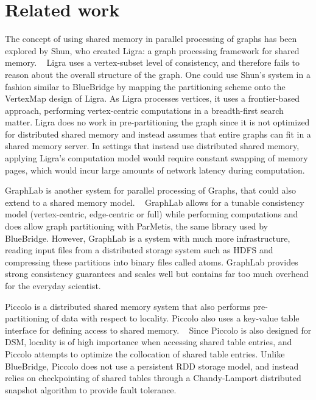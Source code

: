 \section{Related work}
\label{sec:related}


The concept of using shared memory in parallel processing of graphs has been
explored by Shun, who created Ligra: a graph processing framework for shared
memory. ~\cite{Shun:2013:ligra} Ligra uses a vertex-subset level of consistency,
and therefore fails to reason about the overall structure of the graph. One
could use Shun's system in a fashion similar to BlueBridge by mapping the
partitioning scheme onto the VertexMap design of Ligra. As Ligra processes
vertices, it uses a frontier-based approach, performing vertex-centric
computations in a breadth-first search matter. Ligra does no work in
pre-partitioning the graph since it is not optimized for distributed shared
memory and instead assumes that entire graphs can fit in a shared memory
server. In settings that instead use distributed shared memory, applying
Ligra's computation model would require constant swapping of memory pages,
which would incur large amounts of network latency during computation.

GraphLab  is another system for parallel processing of Graphs, that could also
extend to a shared memory model. ~\cite{Low:2012:DGF:2212351.2212354} GraphLab
allows for a tunable consistency model (vertex-centric, edge-centric or full)
while performing computations and does allow graph partitioning with ParMetis,
the same library used by BlueBridge. However, GraphLab is a system with much
more infrastructure, reading input files from a distributed storage system
such as HDFS and compressing these partitions into binary files called atoms.
GraphLab provides strong consistency guarantees and scales well but contains
far too much overhead for the everyday scientist.

Piccolo is a distributed shared memory system that also performs pre-partitioning
of data with respect to locality. Piccolo also uses a key-value table interface 
for defining access to shared memory. ~\cite{Power:2010:PBF:1924943.1924964} Since 
Piccolo is also designed for DSM, locality is of high importance when accessing
shared table entries, and Piccolo attempts to optimize the collocation of shared 
table entries. Unlike BlueBridge, Piccolo does not use a persistent RDD storage
model, and instead relies on checkpointing of shared tables through a Chandy-Lamport
distributed snapshot algorithm to provide fault tolerance.